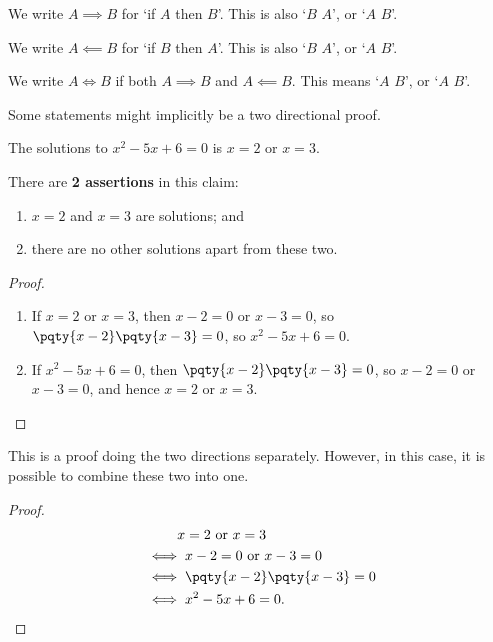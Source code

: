 \begin{definition}
    We write \(A \implies B\) for `if \(A\) then \(B\)'. This is also `\(B\)  \(A\)', or `\(A\)  \(B\)'.

    We write \(A \impliedby B\) for `if \(B\) then \(A\)'. This is also `\(B\)  \(A\)', or `\(A\)  \(B\)'.

    We write \(A \iff B\) if both \(A \implies B\) and \(A \impliedby B\). This means `\(A\)  \(B\)', or `\(A\)  \(B\)'.
\end{definition}

Some statements might implicitly be a two directional proof.

\begin{claim}
    The solutions to \(x^2 - 5x + 6 = 0\) is \(x = 2\) or \(x = 3\).
\end{claim}

There are \textbf{2 assertions} in this claim:
\begin{enumerate}
    \item \(x = 2\) and \(x = 3\) are solutions; and
    \item there are no other solutions apart from these two.
\end{enumerate}

\begin{proof}
    \begin{enumerate}
        \item If \(x = 2\) or \(x = 3\), then \(x - 2 = 0\) or \(x - 3 = 0\), so \(\pqty{x - 2} \pqty{x - 3} = 0\), so \(x^2 - 5x + 6 = 0\).
        \item If \(x^2 - 5x + 6 = 0\), then \(\pqty{x - 2} \pqty{x - 3} = 0\), so \(x - 2 = 0\) or \(x - 3 = 0\), and hence \(x = 2\) or \(x = 3\).
    \end{enumerate}
\end{proof}

This is a proof doing the two directions separately. However, in this case, it is possible to combine these two into one.

\begin{proof}
    \begin{align*}
        &\phantom{\iff} x = 2 \text{ or } x = 3 \\
        &\iff x - 2 = 0 \text{ or } x - 3 = 0 \\
        &\iff \pqty{x - 2} \pqty{x - 3} = 0 \\
        &\iff x^2 - 5x + 6 = 0.
    \end{align*}
\end{proof}


